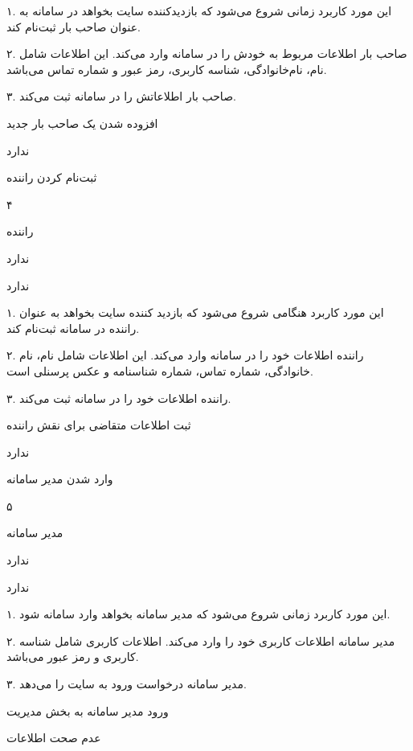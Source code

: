 
۱. این مورد کاربرد زمانی شروع می‌شود که بازدیدکننده سایت بخواهد در سامانه به عنوان صاحب بار ثبت‌نام کند.

۲. صاحب بار اطلاعات مربوط به خودش را در سامانه وارد می‌کند. این اطلاعات شامل نام، نام‌خانوادگی، شناسه کاربری، رمز عبور و شماره تماس می‌باشد.

۳. صاحب بار اطلاعاتش را در سامانه ثبت می‌کند.

افزوده شدن یک صاحب بار جدید

ندارد

\newpage

ثبت‌نام کردن راننده

۴

راننده

ندارد

ندارد


۱. این مورد کاربرد هنگامی شروع می‌شود که بازدید کننده سایت بخواهد به عنوان راننده در سامانه ثبت‌نام کند.

۲. راننده اطلاعات خود را در سامانه وارد می‌کند. این اطلاعات شامل نام، نام خانوادگی، شماره تماس، شماره شناسنامه و عکس پرسنلی است.

۳. راننده اطلاعات خود را در سامانه ثبت می‌کند.

ثبت اطلاعات متقاضی برای نقش راننده

ندارد

\newpage

وارد شدن مدیر سامانه

۵

مدیر سامانه

ندارد

ندارد


۱. این مورد کاربرد زمانی شروع می‌شود که مدیر سامانه بخواهد وارد سامانه شود.

۲. مدیر سامانه اطلاعات کاربری خود را وارد می‌کند. اطلاعات کاربری شامل شناسه کاربری و رمز عبور می‌باشد.

۳. مدیر سامانه درخواست ورود به سایت را می‌دهد.

ورود مدیر سامانه به بخش مدیریت

عدم صحت اطلاعات

\newpage

